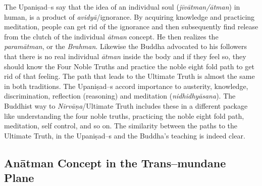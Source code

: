 The Upaniṣad–s say that the idea of an individual soul (\textit{jīvātman/ātman}) in human, is a product of \textit{avidyā}/ignorance. By acquiring knowledge and practicing meditation, people can get rid of the ignorance and then subsequently find release from the clutch of the individual \textit{ātman} concept. He then realizes the \textit{paramātman}, or the \textit{Brahman}. Likewise the Buddha advocated to his followers that there is no real individual \textit{ātman} inside the body and if they feel so, they should know the Four Noble Truths and practice the noble eight fold path to get rid of that feeling. The path that leads to the Ultimate Truth is almost the same in both traditions. The Upaniṣad–s accord importance to austerity, knowledge, discrimination, reflection (reasoning) and meditation (\textit{nidhidhyāsana}). The Buddhist way to \textit{Nirvāṇa}/Ultimate Truth includes these in a different package like understanding the four noble truths, practicing the noble eight fold path, meditation, self control, and so on. The similarity between the paths to the Ultimate Truth, in the Upaniṣad–s and the Buddha’s teaching is indeed clear.


\subsection*{Anātman Concept in the Trans–mundane Plane}

